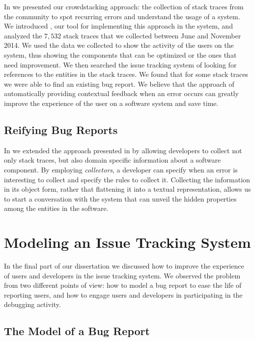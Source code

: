 In  we presented our crowdstacking approach: the collection of stack traces from the community to spot recurring errors and understand the usage of a system.
We introduced \slr, our tool for implementing this approach in the \pha system, and analyzed the $7,532$ stack traces that we collected between June and November 2014.
We used the data we collected to show the activity of the users on the system, thus showing the components that can be optimized or the ones that need improvement.
We then searched the issue tracking system of \pha looking for references to the entities in the stack traces.
We found that for some stack traces we were able to find an existing bug report.
We believe that the approach of automatically providing contextual feedback when an error occurs can greatly improve the experience of the user on a software system and save time.


\subsection{Reifying Bug Reports}

In  we extended the approach presented in  by allowing developers to collect not only stack traces, but also domain specific information about a software component.
By employing \emph{collectors}, a developer can specify when an error is interesting to collect and specify the rules to collect it.
Collecting the information in its object form, rather that flattening it into a textual representation, allows us to start a conversation with the system that can unveil the hidden properties among the entities in the software.



\section{Modeling an Issue Tracking System}

In the final part of our dissertation we discussed how to improve the experience of users and developers in the issue tracking system.
We observed the problem from two different points of view: how to model a bug report to ease the life of reporting users, and how to engage users and developers in participating in the debugging activity.


\subsection{The Model of a Bug Report}


